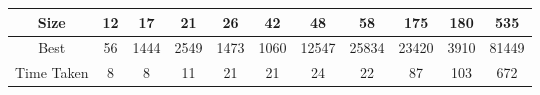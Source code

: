 \documentclass[11pt]{article}
\begin{document}
		\begin{center}
			\begin{tabular}{| c | c | c | c | c | c | c | c | c | c | c |}
				\hline
				Size & 12 & 17 & 21 & 26 & 42 & 48 & 58 & 175 & 180 & 535 \\
				\hline
				Best & 56 & 1444 & 2549 & 1473 & 1060 & 12547 & 25834 & 23420 & 3910 & 81449 \\
				\hline
				Time Taken & 8 & 8 & 11 & 21 & 21 & 24 & 22 & 87 & 103 & 672 \\
				\hline			
			\end{tabular}
		\end{center}
\end{document}
